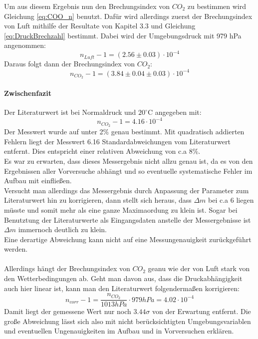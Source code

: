 \documentclass[12pt,a4paper]{article}
\begin{document}
Um aus diesem Ergebnis nun den Brechungsindex von $CO_2$ zu bestimmen wird Gleichung \ref{eq:COO_n} benutzt. Dafür wird allerdings zuerst der Brechungsindex von Luft mithilfe der Resultate von Kapitel 3.3 und Gleichung \ref{eq:DruckBrechzahl} bestimmt. Dabei wird der Umgebungsdruck mit 979 hPa angenommen:
\begin{equation}
n_{Luft}-1 = (2.56 \pm 0.03)\cdot 10^{-4}
\end{equation}
Daraus folgt dann der Brechungsindex von $CO_2$:
\begin{equation}
n_{CO_2}-1 = (3.84 \pm 0.04 \pm 0.03)\cdot 10^{-4}
\end{equation}

\paragraph{Zwischenfazit}
Der Literaturwert ist bei Normaldruck und $20^\circ \text{C}$ angegeben mit:
\begin{equation}
n_{CO_2}-1 = 4.16\cdot 10^{-4}
\end{equation}
Der Messwert wurde auf unter 2\% genau bestimmt.
Mit quadratisch addierten Fehlern liegt der Messwert 6.16 Standardabweichungen vom Literaturwert entfernt. Dies entspricht einer relativen Abweichung von c.a 8\%.\\
Es war zu erwarten, dass dieses Messergebnis nicht allzu genau ist, da es von den Ergebnissen aller Vorversuche abhängt und so eventuelle systematische Fehler im Aufbau mit einfließen.\\
Versucht man allerdings das Messergebnis durch Anpassung der Parameter zum Literaturwert hin zu korrigieren, dann stellt sich heraus, dass $\Delta m$ bei c.a 6 liegen müsste und somit mehr als eine ganze Maximaordung zu klein ist. Sogar bei Benutztung der Literaturwerte als Eingangsdaten anstelle der Messergebnisse ist $\Delta m$ immernoch deutlich zu klein.\\
Eine derartige Abweichung kann nicht auf eine Messungenauigkeit zurückgeführt werden.\\ \\
Allerdings hängt der Brechungsindex von $CO_2$ geanu wie der von Luft stark von den Wetterbedingungen ab. Geht man davon aus, dass die Druckabhängigkeit auch hier linear ist, kann man den Literaturwert folgendermaßen korrigieren:
\begin{equation}
n_{corr}-1 = \dfrac{n_{CO_2}}{1013 hPa} \cdot 979 hPa = 4.02\cdot 10^{-4}
\end{equation}
Damit liegt der gemessene Wert nur noch $3.44 \sigma$ von der Erwartung entfernt. Die große Abweichung lässt sich also mit nicht berücksichtigten Umgebungsvariablen und eventuellen Ungenauigkeiten im Aufbau und in Vorversuchen erklären.
\end{document}
